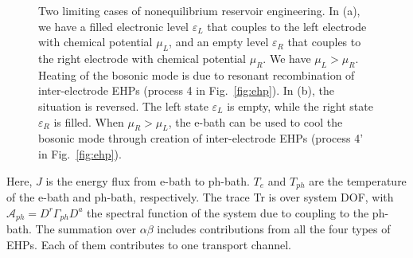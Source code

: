 \documentclass[aps,prb,
,floatfix,footinbib,shortbibliography,
preprint
]{revtex4-1}
\begin{document}

\begin{figure}[h]
	\centering
	\quad
	\caption{Two limiting cases of nonequilibrium reservoir engineering. In (a), we have a filled electronic level $\varepsilon_L$ that couples to the left electrode with chemical potential $\mu_L$, and an empty level $\varepsilon_R$ that couples to the right electrode with chemical potential $\mu_R$. We have $\mu_L>\mu_R$. Heating of the bosonic mode is due to resonant recombination of inter-electrode EHPs (process 4 in Fig.~\ref{fig:ehp}). In (b), the situation is reversed. The left state $\varepsilon_L$ is empty, while the right state $\varepsilon_R$ is filled. When $\mu_R>\mu_L$, the e-bath can be used to cool the bosonic mode through creation of inter-electrode EHPs (process 4' in Fig.~\ref{fig:ehp}). }
	\label{fig:resonant}
\end{figure}

Here, $J$ is the energy flux from e-bath to ph-bath. $T_e$ and $T_{ph}$ are the temperature of the e-bath and ph-bath, respectively. The trace Tr is over system DOF, with $\mathcal{A}_{ph}=D^r \Gamma_{ph} D^a$ the spectral function of the system due to coupling to the ph-bath. The summation over $\alpha\beta$ includes contributions from all the four types of EHPs. Each of them contributes to one transport channel. 
\end{document}
